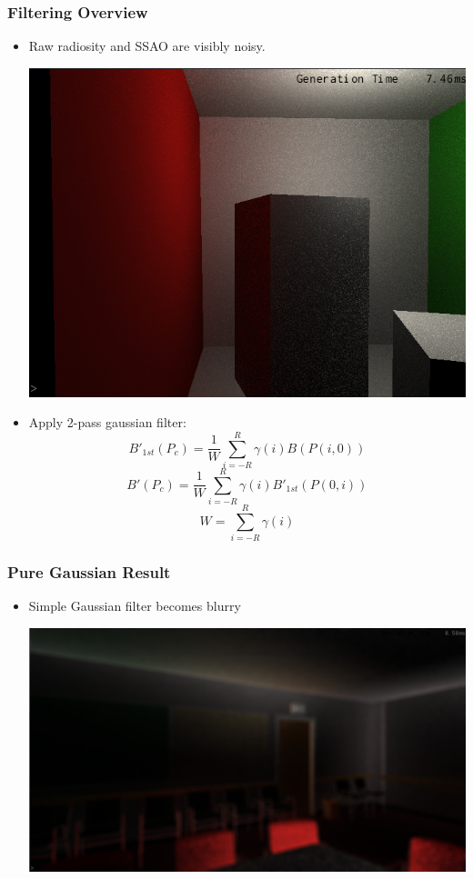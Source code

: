 \documentclass{beamer}
\begin{document}
\begin{frame}
\frametitle{Filtering Overview}
\begin{itemize}
\item Raw radiosity and SSAO are visibly noisy.
\begin{center}
\includegraphics[scale=0.15]{img/noise}
\end{center}
\item Apply 2-pass gaussian filter:
$$B\prime_{1st}(P_{c}) = \frac{1}{W} \sum_{i = -R}^{R} \gamma(i) B(P(i,0))$$
$$B\prime(P_{c}) = \frac{1}{W} \sum_{i = -R}^{R} \gamma(i) B\prime_{1st}(P(0,i))$$
$$W = \sum_{i = -R}^{R} \gamma(i)$$
\end{itemize}
\end{frame}

\begin{frame}
\frametitle{Pure Gaussian Result}
\begin{itemize}
\item Simple Gaussian filter becomes blurry
\begin{center}
\includegraphics[scale=0.3]{img/wo-edge-rad}
\end{center}
\end{itemize}
\end{frame}
\end{document}
